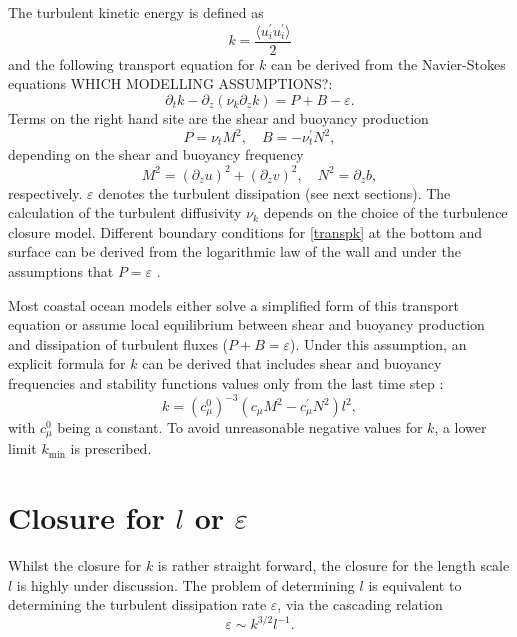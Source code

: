 The turbulent kinetic energy is defined as
\begin{equation}
 \label{TKE}
 k = \frac{\langle u_i^\prime u_i^\prime \rangle}{2}
\end{equation}
and the following transport equation for $k$ can be derived from the 
Navier-Stokes equations \citep[][]{Rodi1993} WHICH MODELLING ASSUMPTIONS?:
\begin{equation}
 \label{transpk}
 \partial_t k - \partial_z (\nu_k \partial_z k) = P + B -\varepsilon.
\end{equation}
Terms on the right hand site are the shear and buoyancy production
\begin{equation}
 \label{PandB}
 P = \nu_t M^2, \quad B=-\nu^\prime_t N^2, 
\end{equation}
depending on the shear and buoyancy frequency
\begin{equation}
 \label{MundN}
 M^2 = (\partial_z u)^2 + (\partial_z v)^2, \quad N^2 = \partial_z b,
\end{equation}
respectively. $\varepsilon$ denotes the turbulent dissipation (see next 
sections). The calculation of the turbulent diffusivity $\nu_k$ depends on the 
choice of the turbulence closure model. Different boundary conditions for 
\eqref{transpk} at the bottom 
and surface can be derived from the logarithmic law of the wall and under the 
assumptions that $P = \varepsilon$ \citep[][]{gotm1999}.

Most coastal ocean models either solve a simplified form of this transport 
equation or assume local equilibrium between shear and buoyancy production and 
dissipation of turbulent fluxes ($P+B=\varepsilon$). Under this assumption, an 
explicit formula for $k$ can be derived that includes shear and buoyancy 
frequencies and stability functions values only from the last time step 
\citep[][]{UmlaufBurchard2005a}:
\begin{equation}
 \label{explick}
 k = (c_\mu^0)^{-3} (c_\mu M^2 - c_\mu^\prime N^2) l^2,
\end{equation}
 with $c_\mu^0$ being a constant. To avoid unreasonable negative values for 
$k$, a lower limit $k_{\min}$ is prescribed.

\section{Closure for $l$ or $\varepsilon$}

Whilst the closure for $k$ is rather straight forward, the closure for the 
length scale $l$ is highly under discussion. The problem of 
determining $l$ is equivalent to determining the turbulent dissipation rate 
$\varepsilon$, via the cascading relation \citep[][]{UmlaufBurchard2005a} 
\begin{equation}
 \label{cascad}
 \varepsilon \sim k^{3 \slash 2} l^{-1}.
\end{equation}

